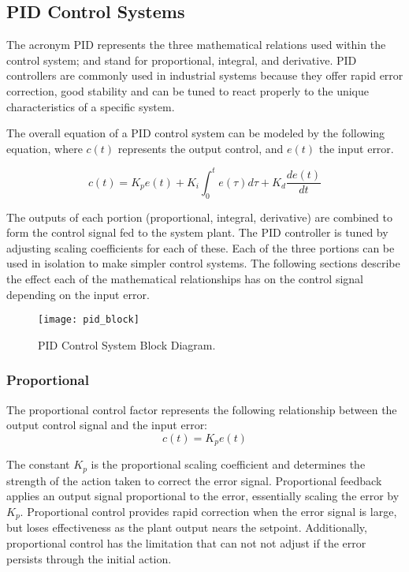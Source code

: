 \documentclass[11pt,fleqn]{book} %
\begin{document}
\subsection{PID Control Systems}
The acronym PID represents the three mathematical relations used within the control system; and stand for proportional, integral, and derivative. PID controllers are commonly used in industrial systems because they offer rapid error correction, good stability and can be tuned to react properly to the unique characteristics of a specific system.

The overall equation of a PID control system can be modeled by the following equation, where $c(t)$ represents the output control, and $e(t)$ the input error. 

    \begin{equation*}
    c(t) = K_{p}e(t) + K_{i}\int_{0}^{t}e(\tau)d\tau + K_{d}\frac{de(t)}{dt}
    \end{equation*} 

The outputs of each portion (proportional, integral, derivative) are combined to form the control signal fed to the system plant. The PID controller is tuned by adjusting scaling coefficients for each of these. Each of the three portions can be used in isolation to make simpler control systems. The following sections describe the effect each of the mathematical relationships has on the control signal depending on the input error. 


\begin{figure}[tb]
    \centering\texttt{[image: pid\_block]}
    \caption{PID Control System Block Diagram.}
    \label{pid_block}
\end{figure}

\subsubsection{Proportional}
The proportional control factor represents the following relationship between the output control signal and the input error:
\begin{equation*}
 c(t) = K_{p}e(t) 
\end{equation*} 

The constant $K_{p}$ is the proportional scaling coefficient and determines the strength of the action taken to correct the error signal. Proportional feedback applies an output signal proportional to the error, essentially scaling the error by $K_{p}$.
Proportional control provides rapid correction when the error signal is large, but loses effectiveness as the plant output nears the setpoint. Additionally, proportional control has the limitation that can not not adjust if the error persists through the initial action. 
\end{document}
